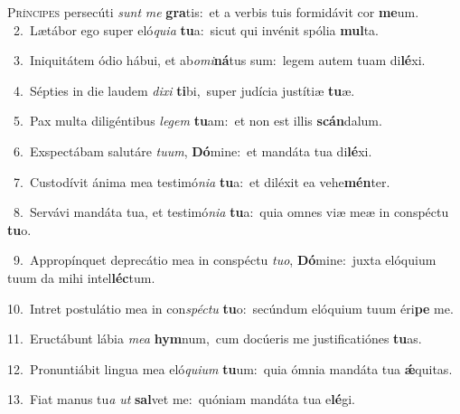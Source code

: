 \lettrine{\initial\textcolor{\initialcolor}{P}}{ríncipes} persecúti \textit{sunt} \textit{me} \textbf{gra}\-tis:~\star et a verbis tuis formidávit cor \textbf{me}\-um.\\
{\numbfont\textcolor{\numbcolor}{~2.}}~Lætábor ego super eló\-\textit{qui}\-\textit{a} \textbf{tu}\-a:~\star sicut qui invénit spólia \textbf{mul}\-ta.\par
{\numbfont\textcolor{\numbcolor}{~3.}}~Iniquitátem ódio hábui, et ab\-\textit{o}\-\textit{mi}\textbf{ná}tus sum:~\star legem autem tuam di\-\textbf{lé}\-xi.\par
{\numbfont\textcolor{\numbcolor}{~4.}}~Sépties in die laudem \textit{di}\-\textit{xi} \textbf{ti}\-bi,~\star super judícia justítiæ \textbf{tu}\-æ.\par
{\numbfont\textcolor{\numbcolor}{~5.}}~Pax multa diligéntibus \textit{le}\-\textit{gem} \textbf{tu}\-am:~\star et non est illis \textbf{scán}\-dalum.\par
{\numbfont\textcolor{\numbcolor}{~6.}}~Exspectábam salutáre \textit{tu}\-\textit{um}, \textbf{Dó}\-mine:~\star et mandáta tua di\-\textbf{lé}\-xi.\par
{\numbfont\textcolor{\numbcolor}{~7.}}~Custodívit ánima mea testimó\-\textit{ni}\-\textit{a} \textbf{tu}\-a:~\star et diléxit ea vehe\-\textbf{mén}\-ter.\par
{\numbfont\textcolor{\numbcolor}{~8.}}~Servávi mandáta tua, et testimó\-\textit{ni}\-\textit{a} \textbf{tu}\-a:~\star quia omnes viæ meæ in conspéctu \textbf{tu}\-o.\par
{\numbfont\textcolor{\numbcolor}{~9.}}~Appropínquet deprecátio mea in conspéctu \textit{tu}\-\textit{o}, \textbf{Dó}\-mine:~\star juxta elóquium tuum da mihi intel\-\textbf{léc}\-tum.\par
{\numbfont\textcolor{\numbcolor}{10.}}~Intret postulátio mea in con\-\textit{spéc}\-\textit{tu} \textbf{tu}\-o:~\star secúndum elóquium tuum éri\textbf{pe} me.\par
{\numbfont\textcolor{\numbcolor}{11.}}~Eructábunt lábia \textit{me}\-\textit{a} \textbf{hym}\-num,~\star cum docúeris me justificatiónes \textbf{tu}\-as.\par
{\numbfont\textcolor{\numbcolor}{12.}}~Pronuntiábit lingua mea eló\-\textit{qui}\-\textit{um} \textbf{tu}\-um:~\star quia ómnia mandáta tua \textbf{ǽ}\-quitas.\par
{\numbfont\textcolor{\numbcolor}{13.}}~Fiat manus tu\textit{a} \textit{ut} \textbf{sal}\-vet me:~\star quóniam mandáta tua e\-\textbf{lé}\-gi.\par
